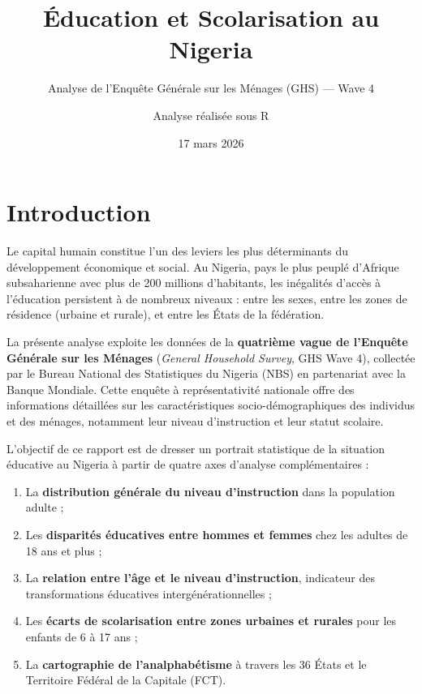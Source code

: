 \documentclass[
  11pt,
]{article}
\title{Éducation et Scolarisation au Nigeria}
\subtitle{Analyse de l'Enquête Générale sur les Ménages (GHS) --- Wave
4}
\author{Analyse réalisée sous R}
\date{17 mars 2026}
\providecommand{\tightlist}{%
  \setlength{\itemsep}{0pt}\setlength{\parskip}{0pt}}
\begin{document}
\maketitle

{
\setcounter{tocdepth}{3}
\tableofcontents
}
\section{Introduction}\label{introduction}

Le capital humain constitue l'un des leviers les plus déterminants du
développement économique et social. Au Nigeria, pays le plus peuplé
d'Afrique subsaharienne avec plus de 200 millions d'habitants, les
inégalités d'accès à l'éducation persistent à de nombreux niveaux :
entre les sexes, entre les zones de résidence (urbaine et rurale), et
entre les États de la fédération.

La présente analyse exploite les données de la \textbf{quatrième vague
de l'Enquête Générale sur les Ménages} (\emph{General Household Survey},
GHS Wave 4), collectée par le Bureau National des Statistiques du
Nigeria (NBS) en partenariat avec la Banque Mondiale. Cette enquête à
représentativité nationale offre des informations détaillées sur les
caractéristiques socio-démographiques des individus et des ménages,
notamment leur niveau d'instruction et leur statut scolaire.

L'objectif de ce rapport est de dresser un portrait statistique de la
situation éducative au Nigeria à partir de quatre axes d'analyse
complémentaires :

\begin{enumerate}
\def\labelenumi{\arabic{enumi}.}
\tightlist
\item
  La \textbf{distribution générale du niveau d'instruction} dans la
  population adulte ;
\item
  Les \textbf{disparités éducatives entre hommes et femmes} chez les
  adultes de 18 ans et plus ;
\item
  La \textbf{relation entre l'âge et le niveau d'instruction},
  indicateur des transformations éducatives intergénérationnelles ;
\item
  Les \textbf{écarts de scolarisation entre zones urbaines et rurales}
  pour les enfants de 6 à 17 ans ;
\item
  La \textbf{cartographie de l'analphabétisme} à travers les 36 États et
  le Territoire Fédéral de la Capitale (FCT).
\end{enumerate}
\end{document}

